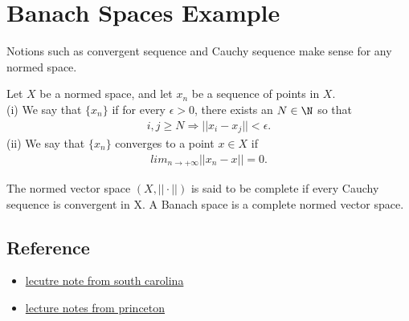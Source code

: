 \chapter{Banach Spaces Example}\label{chp:banach_spaces_exa}


Notions such as convergent sequence and Cauchy sequence make sense for any normed
space.


\begin{definition}{}{}
    Let $X$ be a normed space, and let {$x_n$} be a sequence of points in $X$.\\
    (i) We say that $\{x_n\}$ if for every $\epsilon>0$, there exists an $N\in \N$ so that
    \begin{align*}
        i,j\geq N\Rightarrow ||x_i-x_j||<\epsilon.
    \end{align*}
    (ii) We say that $\{x_n\}$ converges to a point $x\in X$ if
    \begin{align*}
        lim_{n\rightarrow +\infty} ||x_n-x|| = 0.
    \end{align*}
\end{definition}



\begin{definition}{}{}
    The normed vector space $(X, ||\cdot||)$ is said to be complete if every Cauchy sequence is convergent in X. A Banach space is a complete normed vector space.

\end{definition}

\section{Reference}

\begin{itemize}
    \item \href{https://people.math.sc.edu/schep/Banach.pdf}{lecutre note from south carolina}
    \item \href{https://assets.press.princeton.edu/chapters/s9627.pdf}{lecture notes from princeton}
\end{itemize}